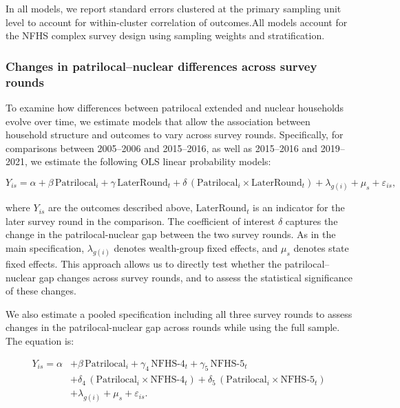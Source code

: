 \documentclass[12pt]{article}
\begin{document}
In all models, we report standard errors clustered at the primary sampling unit level to account for within-cluster correlation of outcomes.All models account for the NFHS complex survey design using sampling weights and stratification.

\subsubsection*{Changes in patrilocal–nuclear differences across survey rounds}

To examine how differences between patrilocal extended and nuclear households evolve over time, we estimate models that allow the association between household structure and outcomes to vary across survey rounds. Specifically, for comparisons between 2005--2006 and 2015--2016, as well as 2015--2016 and 2019--2021, we estimate the following OLS linear probability models:

\begin{equation} \label{eq:tworounds}
Y_{is} = \alpha + \beta \,\text{Patrilocal}_i + \gamma \,\text{LaterRound}_t
+ \delta \,(\text{Patrilocal}_i \times \text{LaterRound}_t)
+ \lambda_{g(i)} + \mu_s + \varepsilon_{is},
\end{equation}


where $Y_{is}$ are the outcomes described above, $\text{LaterRound}_t$ is an indicator for the later survey round in the comparison. The coefficient of interest $\delta$ captures the change in the patrilocal-nuclear gap between the two survey rounds. As in the main specification, $\lambda_{g(i)}$ denotes wealth-group fixed effects, and $\mu_s$ denotes state fixed effects. This approach allows us to directly test whether the patrilocal–nuclear gap changes across survey rounds, and to assess the statistical significance of these changes.

We also estimate a pooled specification including all three survey rounds to assess changes in the patrilocal-nuclear gap across rounds while using the full sample. The equation is:

\begin{equation} \label{eq:stacked}
\begin{aligned}
Y_{is} = \alpha 
&+ \beta \,\text{Patrilocal}_i
+ \gamma_4 \,\text{NFHS-4}_t
+ \gamma_5 \,\text{NFHS-5}_t \\
&+ \delta_4 \,(\text{Patrilocal}_i \times \text{NFHS-4}_t)
+ \delta_5 \,(\text{Patrilocal}_i \times \text{NFHS-5}_t) \\
&+ \lambda_{g(i)} + \mu_s + \varepsilon_{is}.
\end{aligned}
\end{equation}
\end{document}
